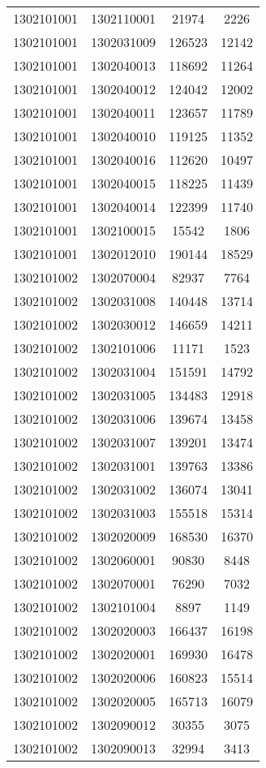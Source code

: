 \begin{longtable}{llcc}
1302101001 & 1302110001 & 21974 & 2226\\
1302101001 & 1302031009 & 126523 & 12142\\
1302101001 & 1302040013 & 118692 & 11264\\
1302101001 & 1302040012 & 124042 & 12002\\
1302101001 & 1302040011 & 123657 & 11789\\
1302101001 & 1302040010 & 119125 & 11352\\
1302101001 & 1302040016 & 112620 & 10497\\
1302101001 & 1302040015 & 118225 & 11439\\
1302101001 & 1302040014 & 122399 & 11740\\
1302101001 & 1302100015 & 15542 & 1806\\
1302101001 & 1302012010 & 190144 & 18529\\
1302101002 & 1302070004 & 82937 & 7764\\
1302101002 & 1302031008 & 140448 & 13714\\
1302101002 & 1302030012 & 146659 & 14211\\
1302101002 & 1302101006 & 11171 & 1523\\
1302101002 & 1302031004 & 151591 & 14792\\
1302101002 & 1302031005 & 134483 & 12918\\
1302101002 & 1302031006 & 139674 & 13458\\
1302101002 & 1302031007 & 139201 & 13474\\
1302101002 & 1302031001 & 139763 & 13386\\
1302101002 & 1302031002 & 136074 & 13041\\
1302101002 & 1302031003 & 155518 & 15314\\
1302101002 & 1302020009 & 168530 & 16370\\
1302101002 & 1302060001 & 90830 & 8448\\
1302101002 & 1302070001 & 76290 & 7032\\
1302101002 & 1302101004 & 8897 & 1149\\
1302101002 & 1302020003 & 166437 & 16198\\
1302101002 & 1302020001 & 169930 & 16478\\
1302101002 & 1302020006 & 160823 & 15514\\
1302101002 & 1302020005 & 165713 & 16079\\
1302101002 & 1302090012 & 30355 & 3075\\
1302101002 & 1302090013 & 32994 & 3413\\

\end{longtable}
